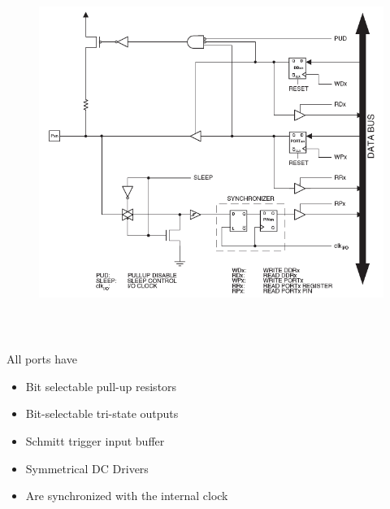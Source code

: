     \begin{figure}[h]
    \centering
    \includegraphics[width=15cm, height=12cm]{Images/image52.png}
    \label{fig:Fig 149}
    \end{figure}

All ports have

\begin{itemize}
\item  Bit selectable pull-up resistors
\item  Bit-selectable tri-state outputs
\item  Schmitt trigger input buffer
\item  Symmetrical DC Drivers
\item  Are synchronized with the internal clock
\end{itemize}